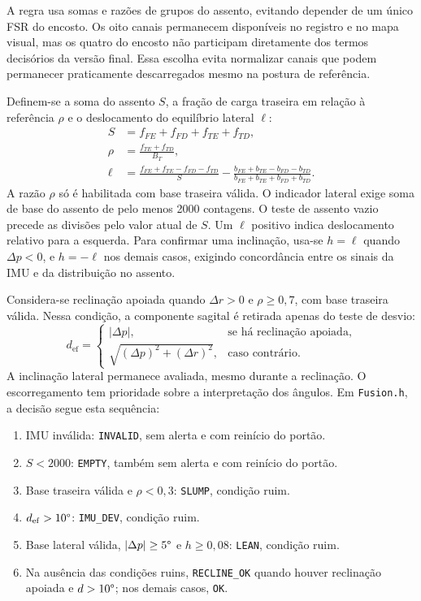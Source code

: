 A regra usa somas e razões de grupos do assento, evitando depender de
um único FSR do encosto. Os oito canais permanecem disponíveis no
registro e no mapa visual, mas os quatro do encosto não participam
diretamente dos termos decisórios da versão final. Essa escolha evita
normalizar canais que podem permanecer praticamente descarregados
mesmo na postura de referência.

Definem-se a soma do assento $S$, a fração de carga traseira em relação
à referência $\rho$ e o deslocamento do equilíbrio lateral $\ell$:
\begin{align}
 S &= f_{FE}+f_{FD}+f_{TE}+f_{TD},
       \label{eq:met-assento}\\
 \rho &= \frac{f_{TE}+f_{TD}}{B_T},
       \label{eq:met-traseira}\\
 \ell &= \frac{f_{FE}+f_{TE}-f_{FD}-f_{TD}}{S}
       -\frac{b_{FE}+b_{TE}-b_{FD}-b_{TD}}
                   {b_{FE}+b_{TE}+b_{FD}+b_{TD}}.
       \label{eq:met-lateral}
\end{align}
A razão $\rho$ só é habilitada com base traseira válida. O indicador
lateral exige soma de base do assento de pelo menos 2000 contagens.
O teste de assento vazio precede as divisões pelo valor atual de $S$.
Um $\ell$ positivo indica deslocamento relativo para a esquerda.
Para confirmar uma inclinação, usa-se $h=\ell$ quando $\Delta p<0$,
e $h=-\ell$ nos demais casos, exigindo concordância entre os sinais
da IMU e da distribuição no assento.

Considera-se reclinação apoiada quando $\Delta r>0$ e
$\rho\geq0{,}7$, com base traseira válida. Nessa condição, a componente
sagital é retirada apenas do teste de desvio:
\begin{equation}
 d_{\mathrm{ef}}=
 \begin{cases}
   |\Delta p|, & \text{se há reclinação apoiada},\\
   \sqrt{(\Delta p)^2+(\Delta r)^2}, & \text{caso contrário}.
 \end{cases}
 \label{eq:met-desvio-efetivo}
\end{equation}
A inclinação lateral permanece avaliada, mesmo durante a reclinação.
O escorregamento tem prioridade sobre a interpretação dos ângulos.
Em \texttt{Fusion.h}, a decisão segue esta sequência:
\begin{enumerate}[nosep]
  \item IMU inválida: \texttt{INVALID}, sem alerta e com reinício do portão.
  \item $S<2000$: \texttt{EMPTY}, também sem alerta e com reinício do portão.
  \item Base traseira válida e $\rho<0{,}3$: \texttt{SLUMP}, condição ruim.
  \item $d_{\mathrm{ef}}>10\degree{}$: \texttt{IMU\_DEV}, condição ruim.
  \item Base lateral válida, $|\Delta p|\geq5\degree{}$ e
        $h\geq0{,}08$: \texttt{LEAN}, condição ruim.
  \item Na ausência das condições ruins, \texttt{RECLINE\_OK} quando
        houver reclinação apoiada e $d>10\degree{}$; nos demais casos,
        \texttt{OK}.
\end{enumerate}


